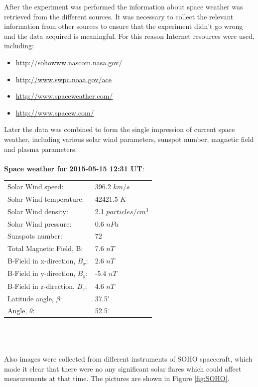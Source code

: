 \documentclass{article}
\begin{document}
After the experiment was performed the information about space weather was retrieved from the different sources. It was necessary to collect the relevant information from other sources to ensure that the experiment didn't go wrong and the data acquired is meaningful. For this reason Internet resources were used, including:
\begin{itemize}
\item \url{http://sohowww.nascom.nasa.gov/}
\item \url{http://www.swpc.noaa.gov/ace}
\item \url{http://www.spaceweather.com/}
\item \url{http://www.spacew.com/}
\end{itemize}
Later the data was combined to form the single impression of current space weather, including various solar wind parameters, sunspot number, magnetic field and plasma parameters.\\
\\
\textbf{Space weather for 2015-05-15 12:31 UT}:\\
\begin{tabular}{ l l }
Solar Wind speed:              & 396.2 $km/s$         \\
Solar Wind temperature:        & 42421.5 $K$          \\
Solar Wind density:            & 2.1 $particles/cm^3$ \\
Solar Wind pressure:           & 0.6 $nPa$            \\
Sunspots number:               & 72                   \\
Total Magnetic Field, B:       & 7.6 $nT$             \\
B-Field in x-direction, $B_x$: & 2.6 $nT$             \\
B-Field in y-direction, $B_y$: & -5.4 $nT$            \\
B-Field in z-direction, $B_z$: & 4.6 $nT$             \\
Latitude angle, $\beta$:       & 37.5$^{\circ}$       \\
Angle, $\theta$:               & 52.5$^{\circ}$       \\
\end{tabular}
\\
\\
\\
Also images were collected from different instruments of SOHO spacecraft, which made it clear that there were no any significant solar flares which could affect measurements at that time. The pictures are shown in Figure \ref{fig:SOHO}.
\end{document}
